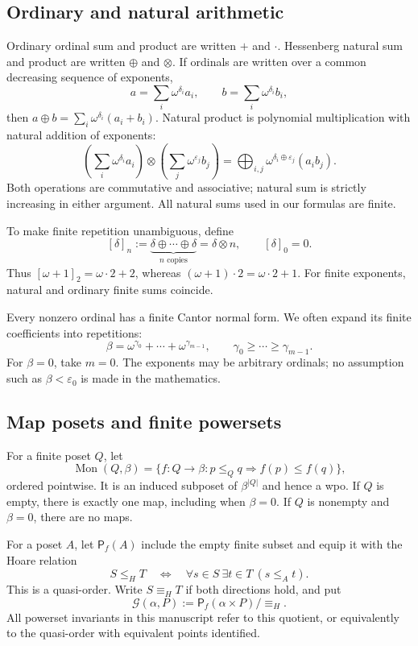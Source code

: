 \documentclass[11pt,a4paper]{article}
\theoremstyle{definition}
\theoremstyle{remark}
\newcommand{\Mon}{\operatorname{Mon}}
\newcommand{\Pf}{\mathsf{P}_{\!f}}
\newcommand{\Grid}{\mathcal{G}}
\newcommand{\Nrep}[2]{\left[#1\right]_{#2}}
\begin{document}
\subsection{Ordinary and natural arithmetic}
Ordinary ordinal sum and product are written $+$ and $\cdot$.
Hessenberg natural sum and product are written $\oplus$ and $\otimes$.
If ordinals are written over a common decreasing sequence of exponents,
\[
 a=\sum_i\omega^{\delta_i}a_i,
 \qquad b=\sum_i\omega^{\delta_i}b_i,
\]
then $a\oplus b=\sum_i\omega^{\delta_i}(a_i+b_i)$. Natural product is
polynomial multiplication with natural addition of exponents:
\[
 \left(\sum_i\omega^{\delta_i}a_i\right)
 \otimes
 \left(\sum_j\omega^{\varepsilon_j}b_j\right)
 =\bigoplus_{i,j}\omega^{\delta_i\oplus\varepsilon_j}(a_i b_j).
\]
Both operations are commutative and associative; natural sum is strictly
increasing in either argument. All natural sums used in our formulas are
finite.

To make finite repetition unambiguous, define
\begin{equation}\label{eq:repeat}
 \Nrep{\delta}{n}
 :=\underbrace{\delta\oplus\cdots\oplus\delta}_{n\text{ copies}}
 =\delta\otimes n,
 \qquad \Nrep{\delta}{0}=0.
\end{equation}
Thus $\Nrep{\omega+1}{2}=\omega\cdot2+2$, whereas
$(\omega+1)\cdot2=\omega\cdot2+1$.
For finite exponents, natural and ordinary finite sums coincide.

Every nonzero ordinal has a finite Cantor normal form. We often expand
its finite coefficients into repetitions:
\begin{equation}\label{eq:beta}
 \beta=\omega^{\gamma_0}+\cdots+\omega^{\gamma_{m-1}},
 \qquad \gamma_0\geq\cdots\geq\gamma_{m-1}.
\end{equation}
For $\beta=0$, take $m=0$. The exponents may be arbitrary ordinals; no
assumption such as $\beta<\varepsilon_0$ is made in the mathematics.

\subsection{Map posets and finite powersets}
For a finite poset $Q$, let
\[
 \Mon(Q,\beta)
 =\{f:Q\to\beta: p\leq_Qq\Rightarrow f(p)\leq f(q)\},
\]
ordered pointwise. It is an induced subposet of $\beta^{|Q|}$ and hence a
wpo. If $Q$ is empty, there is exactly one map, including when $\beta=0$.
If $Q$ is nonempty and $\beta=0$, there are no maps.

For a poset $A$, let $\Pf(A)$ include the empty finite subset and equip it
with the Hoare relation
\begin{equation}\label{eq:Hoare}
 S\leq_H T
 \quad\Longleftrightarrow\quad
 \forall s\in S\ \exists t\in T\ (s\leq_A t).
\end{equation}
This is a quasi-order. Write $S\equiv_H T$ if both directions hold, and
put
\[
 \Grid(\alpha,P):=\Pf(\alpha\times P)/{\equiv_H}.
\]
All powerset invariants in this manuscript refer to this quotient, or
equivalently to the quasi-order with equivalent points identified.
\end{document}

